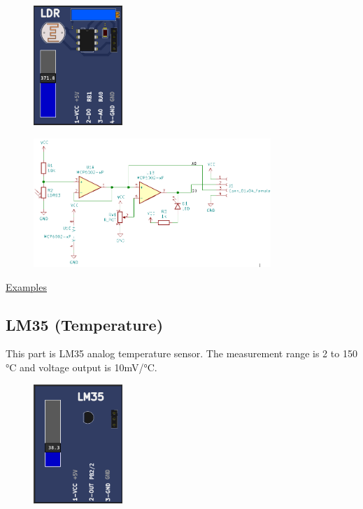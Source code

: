 \begin{figure}[H]
\center
\includegraphics[width=0.3\textwidth]{img/part_LDR.png} 
\end{figure} 

\begin{figure}[H]
\center
\includegraphics[width=0.8\textwidth]{img/part_LDR_.png} 
\end{figure} 


\href{https://lcgamboa.github.io/picsimlab_examples/parts_LDR.html}{Examples}


\subsection{LM35 (Temperature)}

This part is LM35 analog temperature sensor. The measurement range is 2 to 150 °C  and 
voltage output is 10mV/°C.

\begin{figure}[H]
\center
\includegraphics[width=0.3\textwidth]{img/part_lm35.png} 
\end{figure} 


